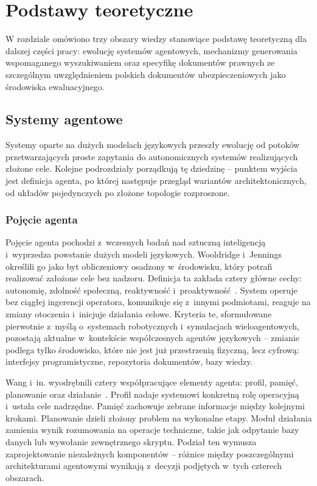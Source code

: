 \chapter{Podstawy teoretyczne}\label{chap:podstawy}

W rozdziale omówiono trzy obszary wiedzy stanowiące podstawę teoretyczną dla
dalszej części pracy: ewolucję systemów agentowych, mechanizmy generowania
wspomaganego wyszukiwaniem oraz specyfikę dokumentów prawnych ze szczególnym
uwzględnieniem polskich dokumentów ubezpieczeniowych jako środowiska
ewaluacyjnego.

\section{Systemy agentowe}\label{sec:systemy-agentowe}

Systemy oparte na dużych modelach językowych przeszły ewolucję od potoków
przetwarzających proste zapytania do autonomicznych systemów realizujących
złożone cele. Kolejne podrozdziały porządkują tę dziedzinę -- punktem wyjścia
jest definicja agenta, po której następuje przegląd wariantów
architektonicznych, od układów pojedynczych po złożone topologie rozproszone.

\subsection{Pojęcie agenta}\label{subsec:pojecie-agenta}

Pojęcie agenta pochodzi z~wczesnych badań nad sztuczną inteligencją i~wyprzedza
powstanie dużych modeli językowych. Wooldridge i~Jennings określili go jako byt
obliczeniowy osadzony w~środowisku, który potrafi realizować założone cele bez
nadzoru. Definicja ta zakłada cztery główne cechy: autonomię, zdolność
społeczną, reaktywność i~proaktywność~\cite{wooldridge1995intelligent}. System
operuje bez ciągłej ingerencji operatora, komunikuje się z~innymi podmiotami,
reaguje na zmiany otoczenia i~inicjuje działania celowe. Kryteria te,
sformułowane pierwotnie z~myślą o~systemach robotycznych i~symulacjach
wieloagentowych, pozostają aktualne w~kontekście współczesnych agentów
językowych -- zmianie podlega tylko środowisko, które nie jest już przestrzenią
fizyczną, lecz cyfrową: interfejsy programistyczne, repozytoria dokumentów,
bazy wiedzy.

Wang i~in. wyodrębnili cztery współpracujące elementy agenta: profil, pamięć,
planowanie oraz działanie~\cite{wang2024survey}. Profil nadaje systemowi
konkretną rolę operacyjną i~ustala cele nadrzędne. Pamięć zachowuje zebrane
informacje między kolejnymi krokami. Planowanie dzieli złożony problem na
wykonalne etapy. Moduł działania zamienia wynik rozumowania na operacje
techniczne, takie jak odpytanie bazy danych lub wywołanie zewnętrznego skryptu.
Podział ten wymusza zaprojektowanie niezależnych komponentów -- różnice między
poszczególnymi architekturami agentowymi wynikają z~decyzji podjętych w~tych
czterech obszarach.

